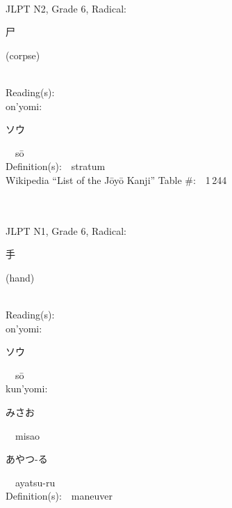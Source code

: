 \begin{multicols}{2}
{\fontsize{34pt}{40pt}  }\ \ \\  %
{JLPT N2, Grade 6, Radical:\ \ {\begin{CJK}{UTF8}{min} 尸 \end{CJK}} (corpse) } \\
Reading(s):\ \ \\
{\hspace*{1em}}on'yomi:\ \ \\
{\hspace*{2em}}{\begin{CJK}{UTF8}{min} ソウ \end{CJK}}\ \ s\=o\ \ \\
Definition(s):\ \ stratum \\
Wikipedia ``List of the J\=oy\=o Kanji'' Table \#:\ \ 1\,244 \\
\ \ \\
{\fontsize{34pt}{40pt}  }\ \ \\  %
{JLPT N1, Grade 6, Radical:\ \ {\begin{CJK}{UTF8}{min} 手 \end{CJK}} (hand) } \\
Reading(s):\ \ \\
{\hspace*{1em}}on'yomi:\ \ \\
{\hspace*{2em}}{\begin{CJK}{UTF8}{min} ソウ \end{CJK}}\ \ s\=o\ \ \\
{\hspace*{1em}}kun'yomi:\ \ \\
{\hspace*{2em}}{\begin{CJK}{UTF8}{min} みさお \end{CJK}}\ \ misao\ \ \\
{\hspace*{2em}}{\begin{CJK}{UTF8}{min} あやつ-る \end{CJK}}\ \ ayatsu-ru\ \ \\
Definition(s):\ \ maneuver \\

\end{multicols}
